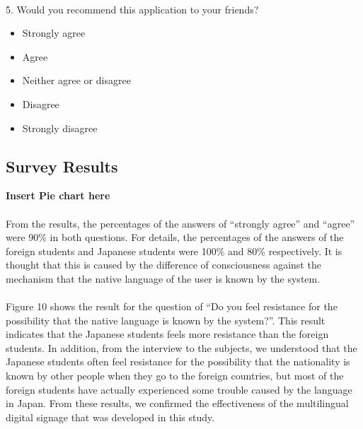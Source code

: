 \documentclass[12pt]{article}
\begin{document}
\paragraph{}
\paragraph{}5. Would you recommend this application to your friends?
\begin{itemize}
	\item Strongly agree
	\item Agree
	\item Neither agree or disagree
	\item Disagree
	\item Strongly disagree
\end{itemize}

\subsection{Survey Results}

\textbf{Insert Pie chart here}

\paragraph{}From the results, the percentages of the answers of “strongly agree” and “agree” were 90\% in both questions. For details, the percentages of the answers of the foreign students and Japanese students were 100\% and 80\% respectively. It is thought that this is caused by the difference of consciousness against the mechanism that the native language of the user is known by the system.

\paragraph{}Figure 10 shows the result for the question of “Do you feel resistance for the possibility that the native language is known by the system?”. This result indicates that the Japanese students feels more resistance than the foreign students. In addition, from the interview to the subjects, we understood that the Japanese students often feel resistance for the possibility that the nationality is known by other people when they go to the foreign countries, but most of the foreign students have actually experienced some trouble caused by the language in Japan. From these results, we confirmed the effectiveness of the multilingual digital signage that was developed in this study.
\end{document}
